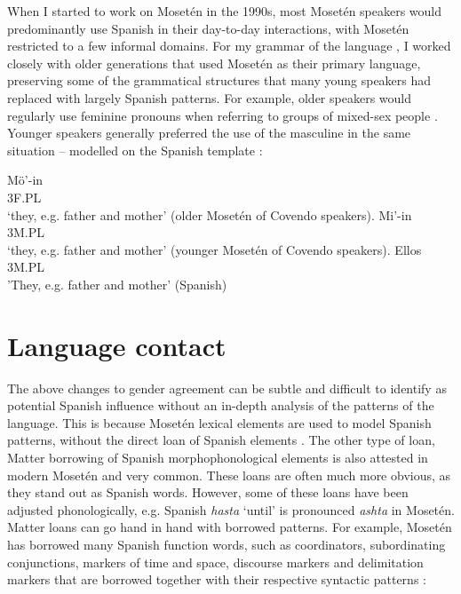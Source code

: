 \documentclass[output=paper,colorlinks,citecolor=brown
]{langscibook}
\begin{document}
When I started to work on Mosetén in the 1990s, most Mosetén speakers would predominantly use Spanish in their day-to-day interactions, with Mosetén restricted to a few informal domains. For my grammar of the language \citep{sakel2004grammar}, I worked closely with older generations that used Mosetén as their primary language, preserving some of the grammatical structures that many young speakers had replaced with largely Spanish patterns. For example, older speakers would regularly use feminine pronouns when referring to groups of mixed-sex people . Younger speakers generally preferred the use of the masculine in the same situation  – modelled on the Spanish template :

\ea \label{sakel_example_1}
\gll Mö'-in\\
     3F.\textsc{PL}\\
\glt `they, e.g. father and mother' (older Mosetén of Covendo speakers).
\z
\ea \label{sakel_example_2}
\gll Mi'-in\\
     3M.\textsc{PL}\\
\glt `they, e.g. father and mother' (younger Mosetén of Covendo speakers).
\z
\ea \label{sakel_example_3}
\gll Ellos\\
     3M.\textsc{PL}\\
\glt 'They, e.g. father and mother' (Spanish)
\z


\section{Language contact}
The above changes to gender agreement can be subtle and difficult to identify as potential Spanish influence without an in-depth analysis of the patterns of the language. This is because Mosetén lexical elements are used to model Spanish patterns, without the direct loan of Spanish elements \citep{matras2007grammatical}\citep{matras2007investigating}. The other type of loan, Matter borrowing of Spanish morphophonological elements is also attested in modern Mosetén and very common. These loans are often much more obvious, as they stand out as Spanish words. However, some of these loans have been adjusted phonologically, e.g. Spanish \textit{hasta} ‘until’ is pronounced \textit{ashta} in Mosetén. Matter loans can go hand in hand with borrowed patterns. For example, Mosetén has borrowed many Spanish function words, such as coordinators, subordinating conjunctions, markers of time and space, discourse markers and delimitation markers that are borrowed together with their respective syntactic patterns \citep{sakel2007language}\citep{sakel2007moseten}:
\end{document}
